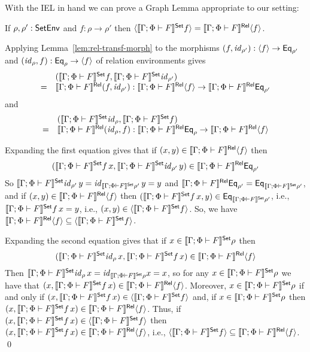 \documentclass{lmcs}
\theoremstyle{plain}\newtheorem{satz}[thm]{Satz}
\renewcommand{\id}{\mathit{id}}
\begin{document}
With the IEL in hand we can prove a Graph Lemma appropriate to our
setting:
\begin{lem}\label{lem:graph}
If $\rho, \rho' : \mathsf{SetEnv}$ and $f : \rho \to \rho'$ then
$\langle {\llbracket{\Gamma; \Phi \vdash F}\rrbracket^{\mathsf{Set}} f} \rangle = \llbracket{\Gamma; \Phi
  \vdash F}\rrbracket^{\mathsf{Rel}}\langle {f} \rangle$.
\end{lem}
\proof
Applying Lemma~\ref{lem:rel-transf-morph} to the morphisms $(f,
\id_{\rho'}) : \graph{f} \to \Eq_{\rho'}$ and $(\id_{\rho}, f) :
\Eq_{\rho} \to \graph{f}$ of relation environments gives 
\[\begin{array}{ll}
  & (\setsem{\Gamma; \Phi \vdash F}f, \setsem{\Gamma; \Phi \vdash
  F}\id_{\rho'})\\
= & \relsem{\Gamma; \Phi \vdash F} (f, \id_{\rho'}) :
\relsem{\Gamma; \Phi \vdash F}\graph{f} \to \relsem{\Gamma; \Phi
  \vdash F}\Eq_{\rho'}
\end{array}\] and
\[\begin{array}{ll}
  & (\setsem{\Gamma; \Phi \vdash F}\id_{\rho}, \setsem{\Gamma; \Phi
  \vdash F}f)\\
= & \relsem{\Gamma; \Phi \vdash F} (\id_{\rho}, f) : \relsem{\Gamma;
  \Phi \vdash F}\Eq_{\rho} \to \relsem{\Gamma; \Phi \vdash
  F}\graph{f}
\end{array}\] 

Expanding the first equation gives that if $(x,y) \in \llbracket{\Gamma;
  \Phi \vdash F}\rrbracket^{\mathsf{Rel}}\langle {f} \rangle$ then
\[(\setsem{\Gamma; \Phi \vdash F} f\,
x, \setsem{\Gamma; \Phi \vdash F}\id_{\rho'}\, y) \in \relsem{\Gamma;
  \Phi \vdash F}\Eq_{\rho'}\] So $\setsem{\Gamma; \Phi \vdash
  F}\id_{\rho'}\, y = \id_{\setsem{\Gamma; \Phi \vdash F}\rho'}\, y =
y$ and $\llbracket{\Gamma; \Phi \vdash F}\rrbracket^{\mathsf{Rel}}\mathsf{Eq}_{\rho'} =
\mathsf{Eq}_{\llbracket{\Gamma; \Phi \vdash F}\rrbracket^{\mathsf{Set}}\rho'}$, and if $(x,y) \in
\llbracket{\Gamma; \Phi \vdash F}\rrbracket^{\mathsf{Rel}}\langle {f} \rangle$ then $(\llbracket{\Gamma; \Phi
  \vdash F}\rrbracket^{\mathsf{Set}} f\, x, y) \in \mathsf{Eq}_{\llbracket{\Gamma; \Phi \vdash F}\rrbracket^{\mathsf{Set}}\rho'}$,
i.e., $\llbracket{\Gamma; \Phi \vdash F}\rrbracket^{\mathsf{Set}} f\, x = y$, i.e., $(x, y) \in
\langle {\llbracket{\Gamma; \Phi \vdash F}\rrbracket^{\mathsf{Set}} f} \rangle$.  So, we have
$\llbracket{\Gamma; \Phi \vdash F}\rrbracket^{\mathsf{Rel}}\langle {f} \rangle \subseteq
\langle {\llbracket{\Gamma; \Phi \vdash F}\rrbracket^{\mathsf{Set}}f} \rangle$.

Expanding the second equation gives that if $x \in \llbracket{\Gamma;
  \Phi \vdash F}\rrbracket^{\mathsf{Set}}\rho$ then
\[(\setsem{\Gamma; \Phi \vdash F}\id_{\rho}\, x, \setsem{\Gamma;
  \Phi \vdash F} f\, x) \in \relsem{\Gamma; \Phi \vdash F}\graph{f}\]
Then $\setsem{\Gamma; \Phi \vdash F}\id_{\rho}\, x =
\id_{\setsem{\Gamma; \Phi \vdash F}\rho} x = x$, so for any $x \in
\llbracket{\Gamma; \Phi \vdash F}\rrbracket^{\mathsf{Set}}\rho$ we have that $(x, \llbracket{\Gamma;
  \Phi \vdash F}\rrbracket^{\mathsf{Set}}f\, x) \in \llbracket{\Gamma; \Phi \vdash F}\rrbracket^{\mathsf{Rel}}\langle {f} \rangle$.
Moreover, $x \in \llbracket{\Gamma; \Phi \vdash F}\rrbracket^{\mathsf{Set}}\rho$ if and only if
$(x, \llbracket{\Gamma; \Phi \vdash F}\rrbracket^{\mathsf{Set}} f\, x) \in \langle {\llbracket{\Gamma;
    \Phi \vdash F}\rrbracket^{\mathsf{Set}}f} \rangle$ and, if $x \in \llbracket{\Gamma; \Phi \vdash
  F}\rrbracket^{\mathsf{Set}}\rho$ then $(x, \llbracket{\Gamma; \Phi \vdash F}\rrbracket^{\mathsf{Set}} f\, x) \in
\llbracket{\Gamma; \Phi \vdash F}\rrbracket^{\mathsf{Rel}} \langle {f} \rangle$. Thus, if $(x, \llbracket{\Gamma;
  \Phi \vdash F}\rrbracket^{\mathsf{Set}} f\, x) \in \langle {\llbracket{\Gamma; \Phi \vdash F}\rrbracket^{\mathsf{Set}}f} \rangle$
then $(x, \llbracket{\Gamma; \Phi \vdash F}\rrbracket^{\mathsf{Set}} f\, x) \in \llbracket{\Gamma;
  \Phi \vdash F}\rrbracket^{\mathsf{Rel}} \langle {f} \rangle$, i.e., $\langle {\llbracket{\Gamma; \Phi \vdash
    F}\rrbracket^{\mathsf{Set}}f} \rangle \subseteq \llbracket{\Gamma; \Phi \vdash F}\rrbracket^{\mathsf{Rel}} \langle {f} \rangle$.  \qed
\end{document}
